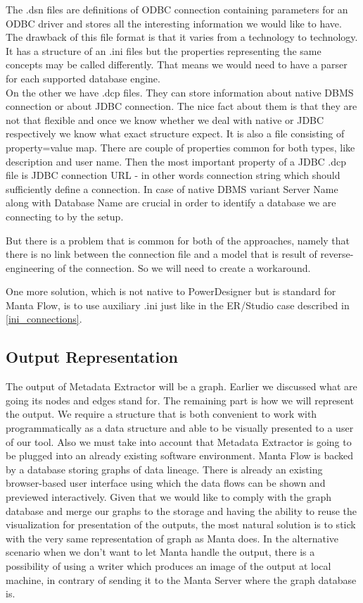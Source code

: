 The .dsn files are definitions of ODBC connection containing parameters for an ODBC driver and stores all the interesting information we would like to have. The drawback of this file format is that it varies from a technology to technology. It has a structure of an .ini files but the properties representing the same concepts may be called differently. That means we would need to have a parser for each supported database engine. \\

On the other we have .dcp files. They can store information about native DBMS connection or about JDBC connection. 
The nice fact about them is that they are not that flexible and once we know whether we deal with native or JDBC respectively we know what exact structure expect. 
It is also a file consisting of property=value map.
There are couple of properties common for both types, like description and user name.
Then the most important property of a JDBC .dcp file is JDBC connection URL - in other words connection string which should sufficiently define a connection.
In case of native DBMS variant Server Name along with Database Name are crucial in order to identify a database we are connecting to by the setup.

But there is a problem that is common for both of the approaches, namely that there is no link between the connection file and a model that is result of reverse-engineering of the connection. So we will need to create a workaround. 

One more solution, which is not native to PowerDesigner but is standard for Manta Flow, is to use auxiliary .ini just like in the ER/Studio case described in \autoref{ini_connections}.

\subsection{Output Representation}

The output of Metadata Extractor will be a graph. Earlier we discussed what are going its nodes and edges stand for. The remaining part is how we will represent the output. We require a structure that is both convenient to work with programmatically as a data structure and able to be visually presented to a user of our tool.
Also we must take into account that Metadata Extractor is going to be plugged into an already existing software environment. 
Manta Flow is backed by a database storing graphs of data lineage. There is already an existing browser-based user interface using which the data flows can be shown and previewed interactively. Given that we would like to comply with the graph database and merge our graphs to the storage and having the ability to reuse the visualization for presentation of the outputs, the most natural solution is to stick with the very same representation of graph as Manta does.
In the alternative scenario when we don't want to let Manta handle the output, there is a possibility of using a writer which produces an image of the output at local machine, in contrary of sending it to the Manta Server where the graph database is.


